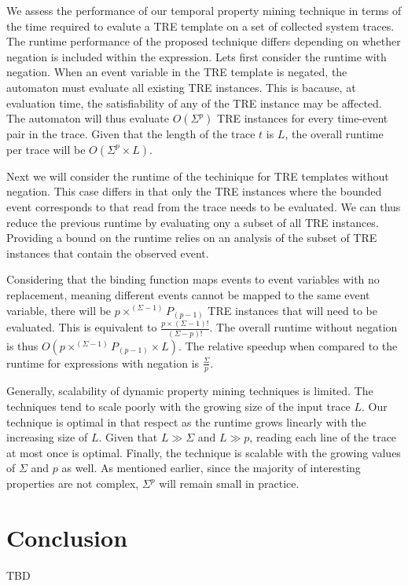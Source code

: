 \documentclass[]{sigplanconf}
\begin{document}
We assess the performance of our temporal property mining technique in terms of the time required to evalute a TRE template on a set of collected system traces.
The runtime performance of the proposed technique differs depending on whether negation is included within the expression.
Lets first consider the runtime with negation. When an event variable in the TRE template is negated, the automaton must evaluate all existing TRE instances. This is bacause, at evaluation time, the satisfiability of any of the TRE instance may be affected. The automaton will thus evaluate $O(\Sigma^p)$ TRE instances for every time-event pair in the trace. Given that the length of the trace $t$ is $L$, the overall runtime per trace will be $O(\Sigma^p \times L)$.

Next we will consider the runtime of the techinique for TRE templates without negation. This case differs in that only the TRE instances where the bounded event corresponds to that read from the trace needs to be evaluated. We can thus reduce the previous runtime by evaluating ony a subset of all TRE instances. Providing a bound on the runtime relies on an analysis of the subset of TRE instances that contain the observed event.

Considering that the binding function maps events to event variables with no replacement, meaning different events cannot be mapped to the same event variable, there will be $p \times ^{(\Sigma - 1)}P_{(p - 1)}$ TRE instances that will need to be evaluated. This is equivalent to $\frac{p \times (\Sigma - 1)!}{(\Sigma - p)!}$. The overall runtime without negation is thus
$O(p \times ^{(\Sigma - 1)}P_{(p - 1)} \times L)$. The relative speedup when compared to the runtime for expressions with negation is $\frac{\Sigma}{p}$.


Generally, scalability of dynamic property mining techniques is limited.
The techniques tend to scale poorly with the growing size of the input trace $L$. Our technique is optimal in that respect as the runtime grows linearly with the increasing size of $L$. Given that $L \gg \Sigma$ and $L \gg p$, reading each line of the trace at most once is optimal.
Finally, the technique is scalable with the growing values of $\Sigma$ and $p$ as well. As mentioned earlier, since the majority of interesting properties are not complex, $\Sigma^p$ will remain small in practice.


\section{Conclusion}

TBD


%


\end{document}
